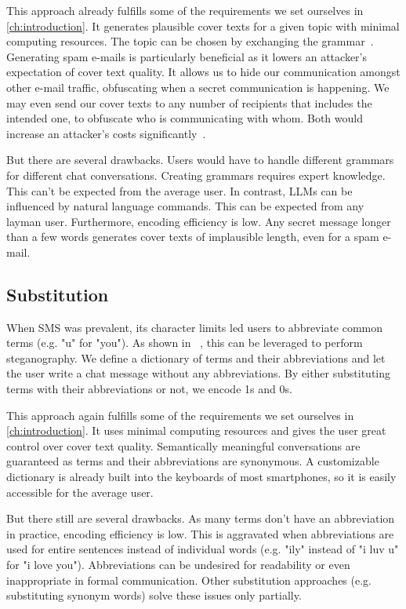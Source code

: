 This approach already fulfills some of the requirements we set ourselves in \cref{ch:introduction}. It generates plausible cover texts for a given topic with minimal computing resources. The topic can be chosen by exchanging the grammar~\cite{spammimicSpammimic2000}. Generating spam e-mails is particularly beneficial as it lowers an attacker's expectation of cover text quality. It allows us to hide our communication amongst other e-mail traffic, obfuscating when a secret communication is happening. We may even send our cover texts to any number of recipients that includes the intended one, to obfuscate who is communicating with whom. Both would increase an attacker's costs significantly~\cite{bennettLinguisticSteganographySurvey2004,petitcolasInformationHidingSurvey1999}.

But there are several drawbacks. Users would have to handle different grammars for different chat conversations. Creating grammars requires expert knowledge. This can't be expected from the average user. In contrast, \glspl{LLM} can be influenced by natural language commands. This can be expected from any layman user. Furthermore, encoding efficiency is low. Any secret message longer than a few words generates cover texts of implausible length, even for a spam e-mail.

\subsection{Substitution}
\label{sec:substitution}
When \gls{SMS} was prevalent, its character limits led users to abbreviate common terms (e.g. "u" for "you"). As shown in ~\cite{shirali-shahrezaTextSteganographySMS2007}, this can be leveraged to perform steganography. We define a dictionary of terms and their abbreviations and let the user write a chat message without any abbreviations. By either substituting terms with their abbreviations or not, we encode 1s and 0s.

This approach again fulfills some of the requirements we set ourselves in \cref{ch:introduction}. It uses minimal computing resources and gives the user great control over cover text quality. Semantically meaningful conversations are guaranteed as terms and their abbreviations are synonymous. A customizable dictionary is already built into the keyboards of most smartphones, so it is easily accessible for the average user.

But there still are several drawbacks. As many terms don't have an abbreviation in practice, encoding efficiency is low. This is aggravated when abbreviations are used for entire sentences instead of individual words (e.g. "ily" instead of "i luv u" for "i love you"). Abbreviations can be undesired for readability or even inappropriate in formal communication. Other substitution approaches (e.g. substituting synonym words) solve these issues only partially.

